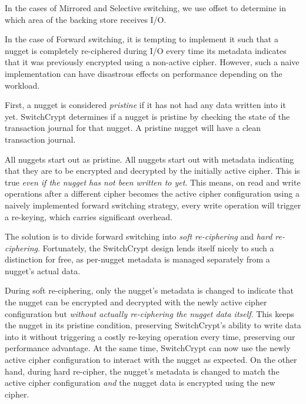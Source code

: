 In the cases of Mirrored and Selective switching, we use offset to determine in
which area of the backing store receives I/O.

In the case of Forward switching, it is tempting to implement it such that a
nugget is completely re-ciphered during I/O every time its metadata indicates
that it was previously encrypted using a non-active cipher. However, such a
naive implementation can have disastrous effects on performance depending on the
workload.

First, a nugget is considered \emph{pristine} if it has not had any data written
into it yet. SwitchCrypt determines if a nugget is pristine by checking the state
of the transaction journal for that nugget. A pristine nugget will have a clean
transaction journal.

All nuggets start out as pristine. All nuggets start out with metadata
indicating that they are to be encrypted and decrypted by the initially active
cipher. This is true \emph{even if the nugget has not been written to yet}. This
means, on read and write operations after a different cipher becomes the active
cipher configuration using a naively implemented forward switching strategy,
every write operation will trigger a re-keying, which carries significant
overhead.

The solution is to divide forward switching into \emph{soft re-ciphering} and
\emph{hard re-ciphering}. Fortunately, the SwitchCrypt design lends itself nicely
to such a distinction for free, as per-nugget metadata is managed separately
from a nugget's actual data.

During soft re-ciphering, only the nugget's metadata is changed to indicate that
the nugget can be encrypted and decrypted with the newly active cipher
configuration but \emph{without actually re-ciphering the nugget data itself}.
This keeps the nugget in its pristine condition, preserving SwitchCrypt's ability
to write data into it without triggering a costly re-keying operation every
time, preserving our performance advantage. At the same time, SwitchCrypt can now
use the newly active cipher configuration to interact with the nugget as
expected. On the other hand, during hard re-cipher, the nugget's metadata is
changed to match the active cipher configuration \emph{and} the nugget data is
encrypted using the new cipher.


